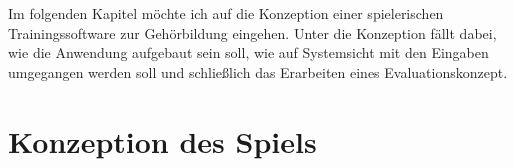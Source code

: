 Im folgenden Kapitel möchte ich auf die Konzeption einer spielerischen Trainingssoftware zur Gehörbildung eingehen. Unter die Konzeption fällt dabei, wie die Anwendung aufgebaut sein soll, wie auf Systemsicht mit den Eingaben umgegangen werden soll und schließlich das Erarbeiten eines Evaluationskonzept.


\section{Konzeption des Spiels}
%

